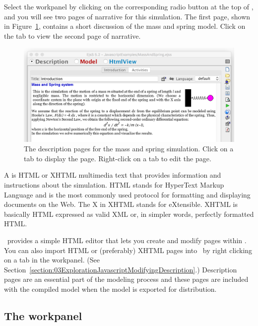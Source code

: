 Select the  workpanel by clicking on the corresponding radio button at the top of
\ejs, and you will see two pages of narrative for this simulation. The first page, shown in
Figure~\ref{fig:03ExplorationJavascript/SpringDesc}, contains a short discussion of the mass and spring model. Click on the
 tab to view the second page of narrative.

\begin{figure}[htb]
  \centering
  \includegraphics[scale=\scale]{03ExplorationJavascript/images/SpringDesc.png}
  \caption{The description pages for the mass and spring simulation. Click on a tab to display the page. Right-click on a tab to edit the page.}
  \label{fig:03ExplorationJavascript/SpringDesc}
\end{figure}

A  is HTML or XHTML multimedia text that provides information and instructions about the
simulation. HTML stands for HyperText Markup Language and is the most commonly used protocol for formatting and
displaying documents on the Web. The X in XHTML stands for eXtensible. XHTML is basically HTML expressed as valid XML or, in simpler words, perfectly formatted HTML.

\ejs\ provides a simple HTML editor that lets you create and modify pages within \ejs.
You can also import HTML or (preferably) XHTML pages into \ejs\ by right clicking on a tab in the  workpanel. (See
Section~\ref{section:03ExplorationJavascriptModifyingDescription}.) Description pages are an essential part of the modeling process and
these pages are included with the compiled model when the model is exported for distribution.

\subsection{The  workpanel}\label{section:03ExplorationJavascriptModel}

